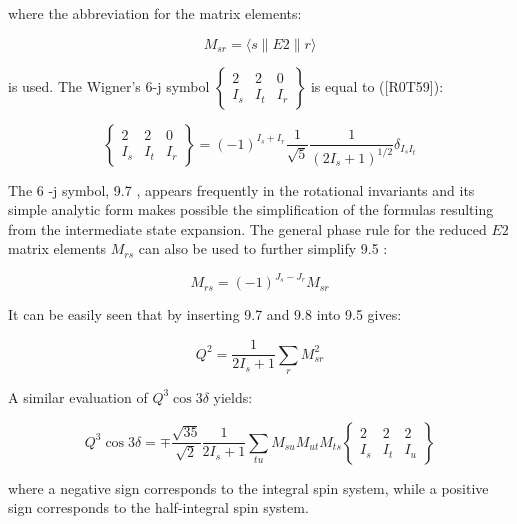 \documentclass[10pt]{article}
\begin{document}
where the abbreviation for the matrix elements:


\begin{equation*}
M_{s r}=\langle s\|E 2\| r\rangle \tag{9.6}
\end{equation*}


is used. The Wigner's 6-j symbol $\left\{\begin{array}{ccc}2 & 2 & 0 \\ I_{s} & I_{t} & I_{r}\end{array}\right\}$ is equal to ([R0T59]):

\[
\left\{\begin{array}{ccc}
2 & 2 & 0  \tag{9.7}\\
I_{s} & I_{t} & I_{r}
\end{array}\right\}=(-1)^{I_{s}+I_{r}} \frac{1}{\sqrt{5}} \frac{1}{\left(2 I_{s}+1\right)^{1 / 2}} \delta_{I_{s} I_{t}}
\]

The 6 -j symbol, 9.7 , appears frequently in the rotational invariants and its simple analytic form makes possible the simplification of the formulas resulting from the intermediate state expansion. The general phase rule for the reduced $E 2$ matrix elements $M_{r s}$ can also be used to further simplify 9.5 :


\begin{equation*}
M_{r s}=(-1)^{J_{s}-J_{r}} M_{s r} \tag{9.8}
\end{equation*}


It can be easily seen that by inserting 9.7 and 9.8 into 9.5 gives:


\begin{equation*}
Q^{2}=\frac{1}{2 I_{s}+1} \sum_{r} M_{s r}^{2} \tag{9.9}
\end{equation*}


A similar evaluation of $Q^{3} \cos 3 \delta$ yields:

\[
Q^{3} \cos 3 \delta=\mp \frac{\sqrt{35}}{\sqrt{2}} \frac{1}{2 I_{s}+1} \sum_{t u} M_{s u} M_{u t} M_{t s}\left\{\begin{array}{ccc}
2 & 2 & 2  \tag{9.10}\\
I_{s} & I_{t} & I_{u}
\end{array}\right\}
\]

where a negative sign corresponds to the integral spin system, while a positive sign corresponds to the half-integral spin system.
\end{document}
